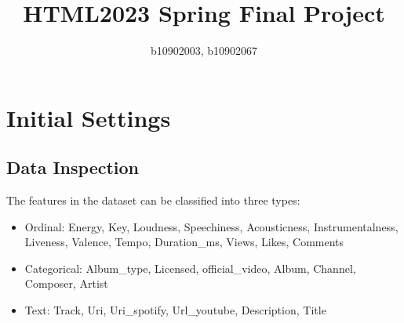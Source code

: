 \documentclass[10pt,letterpaper]{article}
\title{
		\usefont{OT1}{bch}{b}{n}
		\huge HTML2023 Spring Final Project \\
}
\author{b10902003, b10902067}
\begin{document}
\maketitle






\section{Initial Settings}
\subsection{Data Inspection}

The features in the dataset can be classified into three types:
\begin{itemize}
  \item Ordinal: Energy, Key, Loudness, Speechiness, Acousticness, Instrumentalness, Liveness, Valence, Tempo, Duration\_ms, Views, Likes, Comments
  \item Categorical: Album\_type, Licensed, official\_video, Album, Channel, Composer, Artist
  \item Text: Track, Uri, Uri\_spotify, Url\_youtube, Description, Title
\end{itemize}
\end{document}
